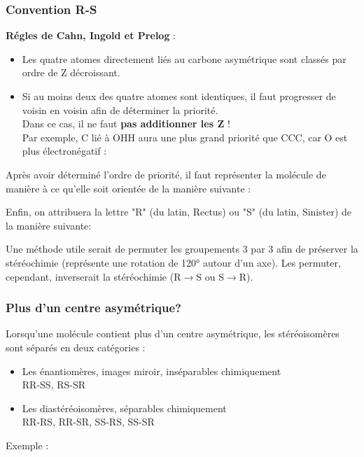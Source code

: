 \documentclass{article}
\newcommand{\insertslide}[2]{
\begin{center}
    \fbox{\texttt{[image: \#1]}}
\end{center}
}
\begin{document}
        \subsubsection{Convention R-S}
            \textbf{Régles de Cahn, Ingold et Prelog} :
            \begin{itemize}
                \item Les quatre atomes directement liés au carbone
                asymétrique sont classés par ordre de Z décroissant.
                \item Si au moins deux des quatre atomes sont identiques,
                il faut progresser de voisin en voisin afin de déterminer
                la priorité.\\
                Dans ce cas, il ne faut \textbf{pas additionner les Z} !\\
                Par exemple, C lié à OHH aura une plus grand priorité que CCC,
                car O est plus électronégatif :
                \insertslide{Slides/CM2.pdf}{22}
            \end{itemize}
            Après avoir déterminé l'ordre de priorité, il faut représenter
            la molécule de manière à ce qu'elle soit orientée de la manière
            suivante :
            \insertslide{Slides/CM2.pdf}{24}
            Enfin, on attribuera la lettre "R" (du latin, Rectus) ou "S" (du latin, Sinister)
            de la manière suivante:
            \insertslide{Slides/CM2.pdf}{25}
            Une méthode utile serait de permuter les groupements 3 par 3 
            afin de préserver la stéréochimie (représente une rotation de 120°
            autour d'un axe).
            Les permuter, cependant, inverserait la stéréochimie (R$\rightarrow$S ou S$\rightarrow$R).
        
        \subsubsection{Plus d'un centre asymétrique?}
            Lorsqu'une molécule contient plus d'un centre asymétrique, les 
            stéréoisomères sont séparés en deux catégories :
            \begin{itemize}
                \item Les énantiomères, images miroir, inséparables chimiquement\\
                RR-SS, RS-SR 
                \item Les diastéréoisomères, séparables chimiquement\\
                RR-RS, RR-SR, SS-RS, SS-SR
            \end{itemize}
            Exemple :
            \insertslide{Slides/CM2.pdf}{27}
            \insertslide{Slides/CM2.pdf}{28}
        
\end{document}
